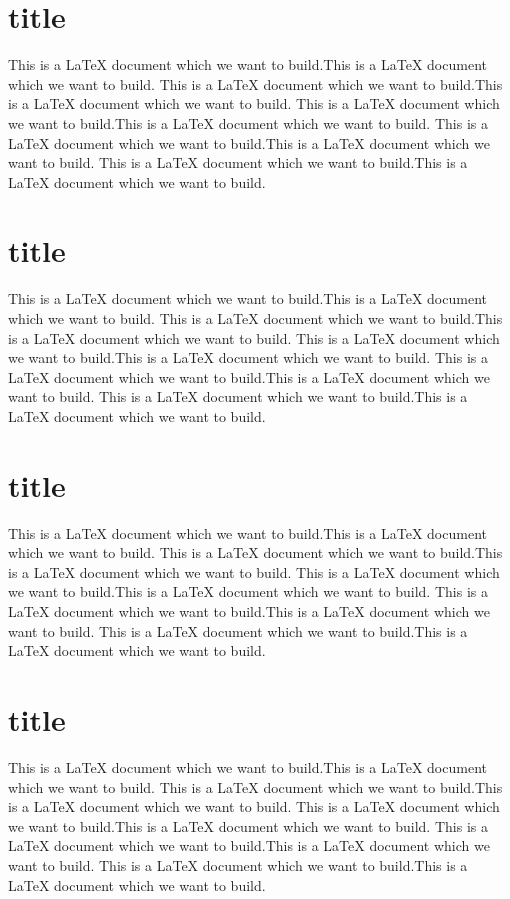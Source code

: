 \documentclass{book}
\begin{document}
    \section{title}
    This is a LaTeX document which we want to build.This is a LaTeX document which we want to build.
    This is a LaTeX document which we want to build.This is a LaTeX document which we want to build.
    This is a LaTeX document which we want to build.This is a LaTeX document which we want to build.
    This is a LaTeX document which we want to build.This is a LaTeX document which we want to build.
    This is a LaTeX document which we want to build.This is a LaTeX document which we want to build.
    \section{title}
    This is a LaTeX document which we want to build.This is a LaTeX document which we want to build.
    This is a LaTeX document which we want to build.This is a LaTeX document which we want to build.
    This is a LaTeX document which we want to build.This is a LaTeX document which we want to build.
    This is a LaTeX document which we want to build.This is a LaTeX document which we want to build.
    This is a LaTeX document which we want to build.This is a LaTeX document which we want to build.
    \section{title}
    This is a LaTeX document which we want to build.This is a LaTeX document which we want to build.
    This is a LaTeX document which we want to build.This is a LaTeX document which we want to build.
    This is a LaTeX document which we want to build.This is a LaTeX document which we want to build.
    This is a LaTeX document which we want to build.This is a LaTeX document which we want to build.
    This is a LaTeX document which we want to build.This is a LaTeX document which we want to build.
    \section{title}
    This is a LaTeX document which we want to build.This is a LaTeX document which we want to build.
    This is a LaTeX document which we want to build.This is a LaTeX document which we want to build.
    This is a LaTeX document which we want to build.This is a LaTeX document which we want to build.
    This is a LaTeX document which we want to build.This is a LaTeX document which we want to build.
    This is a LaTeX document which we want to build.This is a LaTeX document which we want to build.
\end{document}
